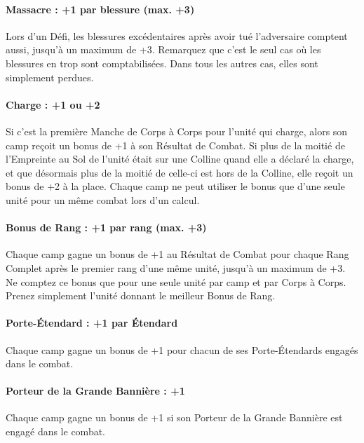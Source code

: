 \paragraph{Massacre : +1 par blessure (max. +3)}

Lors d'un Défi, les blessures excédentaires après avoir tué l'adversaire comptent aussi, jusqu'à un maximum de +3. Remarquez que c'est le seul cas où les blessures en trop sont comptabilisées. Dans tous les autres cas, elles sont simplement perdues.

\paragraph{Charge : +1 ou +2}

Si c'est la première Manche de Corps à Corps pour l'unité qui charge, alors son camp reçoit un bonus de +1 à son Résultat de Combat. Si plus de la moitié de l'Empreinte au Sol de l'unité était sur une Colline quand elle a déclaré la charge, et que désormais plus de la moitié de celle-ci est hors de la Colline, elle reçoit un bonus de +2 à la place. Chaque camp ne peut utiliser le bonus que d'une seule unité pour un même combat lors d'un calcul.

\paragraph{Bonus de Rang : +1 par rang (max. +3)}

Chaque camp gagne un bonus de +1 au Résultat de Combat pour chaque Rang Complet après le premier rang d'une même unité, jusqu'à un maximum de +3. Ne comptez ce bonus que pour une seule unité par camp et par Corps à Corps. Prenez simplement l'unité donnant le meilleur Bonus de Rang.

\paragraph{Porte-Étendard : +1 par Étendard}

Chaque camp gagne un bonus de +1 pour chacun de ses Porte-Étendards engagés dans le combat.

\paragraph{Porteur de la Grande Bannière : +1}

Chaque camp gagne un bonus de +1 si son Porteur de la Grande Bannière est engagé dans le combat.

